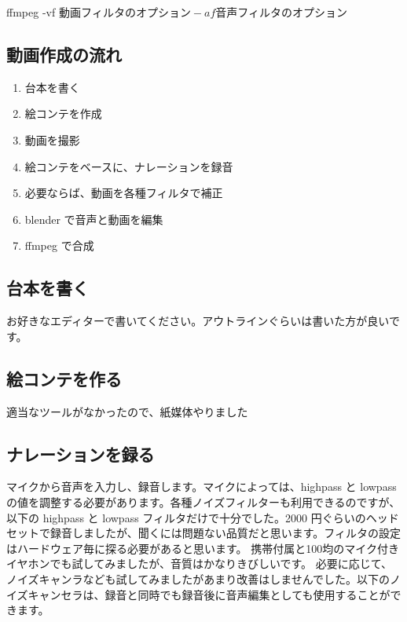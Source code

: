 \documentclass[mingoth,a4paper]{jsarticle}
\begin{document}
\begin{commandline}
ffmpeg -vf ${動画フィルタのオプション} -af ${音声フィルタのオプション}
\end{commandline}

\subsection{動画作成の流れ}

\begin{enumerate}
\item{台本を書く}
\item{絵コンテを作成}
\item{動画を撮影}
\item{絵コンテをベースに、ナレーションを録音}
\item{必要ならば、動画を各種フィルタで補正}
\item{blender で音声と動画を編集}
\item{ffmpeg で合成}
\end{enumerate}

\subsection{台本を書く}
お好きなエディターで書いてください。アウトラインぐらいは書いた方が良いです。

\subsection{絵コンテを作る}
適当なツールがなかったので、紙媒体やりました

\subsection{ナレーションを録る}
マイクから音声を入力し、録音します。マイクによっては、highpass と lowpass の値を調整する必要があります。各種ノイズフィルターも利用できるのですが、以下の highpass と lowpass フィルタだけで十分でした。2000 円ぐらいのヘッドセットで録音しましたが、聞くには問題ない品質だと思います。フィルタの設定はハードウェア毎に探る必要があると思います。
携帯付属と100均のマイク付きイヤホンでも試してみましたが、音質はかなりきびしいです。
必要に応じて、ノイズキャンラなども試してみましたがあまり改善はしませんでした。以下のノイズキャンセラは、録音と同時でも録音後に音声編集としても使用することができます。
\end{document}
